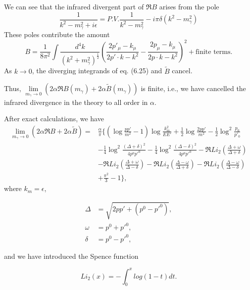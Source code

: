 We can see that the infrared divergent part of $\Re B$ arises from the pole
\begin{equation}
\frac{1}{k^2-m_\gamma^2+i\epsilon} = P.V.\frac{1}{k^2-m_\gamma^2} - i\pi\delta(k^2 - m_\gamma^2)
\end{equation}
These poles contribute the amount
\begin{equation}
B = \frac{1}{8\pi^2}\int\frac{d^4 k}{(k^2 + m_\gamma^2)^{\frac{1}{2}}}\left( \frac{2p'_\mu - k_\mu}{2p'\cdot k - k^2} - \frac{2p_\mu - k_\mu}{2p\cdot k - k^2}\right)^2 + \text{finite terms}.
\end{equation}
As $k\to 0$, the diverging integrands of eq. (6.25) and  $\tilde{B}$ cancel.

Thus, $\lim\limits_{m_\gamma \to 0}(2\alpha \Re B(m_\gamma)+2\alpha\tilde{B}(m_\gamma))$ is finite, i.e., we have cancelled the infrared divergence in the theory to all order in $\alpha$. 

After exact calculations, we have \cite{BFLW1987,BFLWQFT} 
\begin{align}
\lim\limits_{m_\gamma \to 0}(2\alpha \Re B+2\alpha\tilde{B}) =& \frac{\alpha}{\pi}\Biggl\{ \left( \log{\frac{pp'}{m^2}} - 1\right)\log{\frac{k_m^2}{EE'}}+\frac{1}{2}\log{\frac{2pp'}{m^2}}-\frac{1}{2} \log^2\frac{p_0}{p'_0}\nonumber\\
&-\frac{1}{4}\log^2{\frac{(\Delta+\delta)^2}{4p^0 p'^0}} -\frac{1}{4}\log^2{\frac{(\Delta-\delta)^2}{4p^0 p'^0}}-\Re Li_2\left(\frac{\Delta+\omega}{\Delta+\delta}\right)\nonumber\\
&-\Re Li_2\left(\frac{\Delta+\omega}{\Delta-\delta}\right)\nonumber -\Re Li_2\left(\frac{\Delta-\omega}{\Delta+\delta}\right)\nonumber -\Re Li_2\left(\frac{\Delta-\omega}{\Delta-\delta}\right)\nonumber\nonumber\\
&+\frac{\pi^2}{3} - 1  \Biggr\},
\end{align}
where $k_m = \epsilon$,

\begin{align*}
\Delta &= \sqrt{2pp' + (p^0 - p'^0)},\nonumber\\
\omega &= p^0 + p'^0,\nonumber\\
\delta &= p^0 - p'^0,
\end{align*}

and we have introduced the Spence function

\begin{equation*}
Li_2(x) = -\int_0^x log(1 - t) dt.
\end{equation*}


